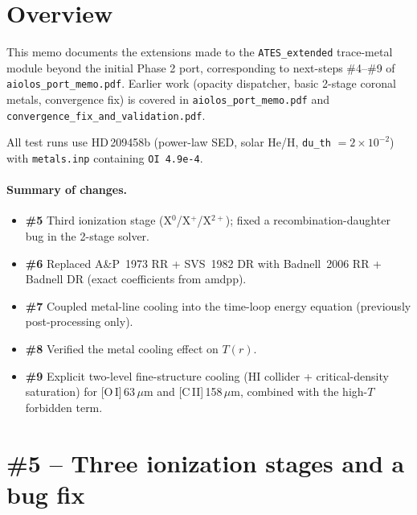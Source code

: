 \documentclass[english,a4paper]{my_memo}
\begin{document}
\section{Overview}

\begin{sloppypar}
This memo documents the extensions made to the \texttt{ATES\_extended}
trace-metal module beyond the initial Phase 2 port, corresponding to
next-steps \#4--\#9 of \texttt{aiolos\_port\_memo.pdf}.  Earlier work
(opacity dispatcher, basic 2-stage coronal metals, convergence fix) is
covered in \texttt{aiolos\_port\_memo.pdf} and
\texttt{convergence\_fix\_and\_validation.pdf}.
\end{sloppypar}

All test runs use HD\,209458b (power-law SED, solar He/H, \texttt{du\_th}
$=2\times10^{-2}$) with \texttt{metals.inp} containing \texttt{OI 4.9e-4}.

\paragraph{Summary of changes.}
\begin{itemize}
\item \textbf{\#5} Third ionization stage (X$^0$/X$^+$/X$^{2+}$);
  fixed a recombination-daughter bug in the 2-stage solver.
\item \textbf{\#6} Replaced A\&P~1973 RR + SVS~1982 DR with
  Badnell~2006 RR + Badnell DR (exact coefficients from amdpp).
\item \textbf{\#7} Coupled metal-line cooling into the time-loop energy
  equation (previously post-processing only).
\item \textbf{\#8} Verified the metal cooling effect on $T(r)$.
\item \textbf{\#9} Explicit two-level fine-structure cooling (HI
  collider + critical-density saturation) for [O\,I]\,63\,$\mu$m and
  [C\,II]\,158\,$\mu$m, combined with the high-$T$ forbidden term.
\end{itemize}

\section{\#5 -- Three ionization stages and a bug fix}
\end{document}
